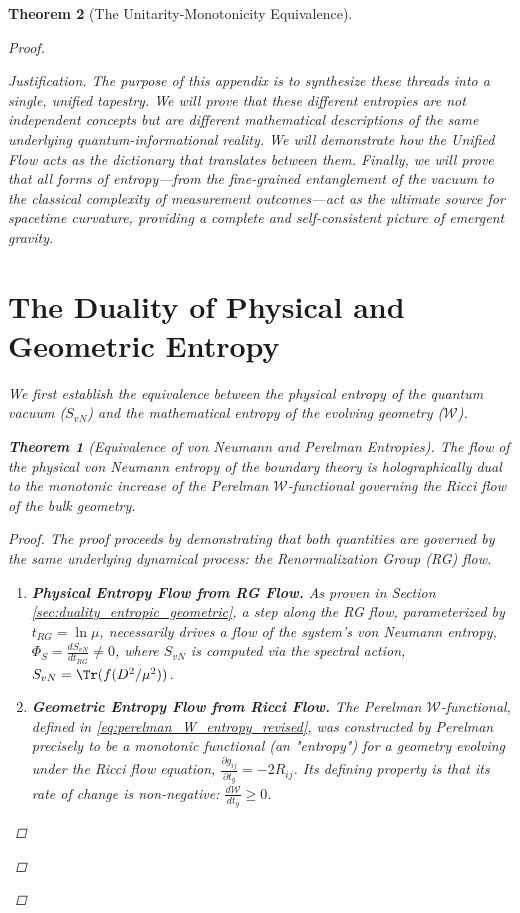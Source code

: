 \documentclass[11pt, letterpaper]{report}
\theoremstyle{plain} %
\newtheorem{theorem}{Theorem}[chapter]
\theoremstyle{definition} %
\theoremstyle{remark} %
\begin{document}
\begin{theorem}[The Unitarity-Monotonicity Equivalence]
\begin{proof}
\begin{proof}[Justification]
The purpose of this appendix is to synthesize these threads into a single, unified tapestry. We will prove that these different entropies are not independent concepts but are different mathematical descriptions of the same underlying quantum-informational reality. We will demonstrate how the Unified Flow acts as the dictionary that translates between them. Finally, we will prove that all forms of entropy—from the fine-grained entanglement of the vacuum to the classical complexity of measurement outcomes—act as the ultimate source for spacetime curvature, providing a complete and self-consistent picture of emergent gravity.

\section{The Duality of Physical and Geometric Entropy}
\label{app:svn_perelman_duality}

We first establish the equivalence between the physical entropy of the quantum vacuum ($S_{vN}$) and the mathematical entropy of the evolving geometry ($\mathcal{W}$).

\begin{theorem}[Equivalence of von Neumann and Perelman Entropies]
\label{thm:svn_w_equivalence}
The flow of the physical von Neumann entropy of the boundary theory is holographically dual to the monotonic increase of the Perelman $\mathcal{W}$-functional governing the Ricci flow of the bulk geometry.
\end{theorem}
\begin{proof}
The proof proceeds by demonstrating that both quantities are governed by the same underlying dynamical process: the Renormalization Group (RG) flow.
\begin{enumerate}
    \item \textbf{Physical Entropy Flow from RG Flow.} As proven in Section \ref{sec:duality_entropic_geometric}, a step along the RG flow, parameterized by $t_{RG} = \ln\mu$, necessarily drives a flow of the system's von Neumann entropy, $\Phi_S = \frac{dS_{vN}}{dt_{RG}} \neq 0$, where $S_{vN}$ is computed via the spectral action, $S_{vN} = \Tr(f(D^2/\mu^2))$.

    \item \textbf{Geometric Entropy Flow from Ricci Flow.} The Perelman $\mathcal{W}$-functional, defined in \cref{eq:perelman_W_entropy_revised}, was constructed by Perelman precisely to be a monotonic functional (an "entropy") for a geometry evolving under the Ricci flow equation, $\frac{\partial g_{ij}}{\partial t_g} = -2R_{ij}$. Its defining property is that its rate of change is non-negative: $\frac{d\mathcal{W}}{dt_g} \ge 0$.


\end{enumerate}
\end{proof}
\end{proof}
\end{proof}
\end{theorem}
\end{document}
